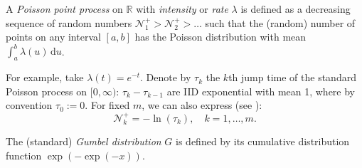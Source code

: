 \documentclass[12pt]{amsart}
\begin{document}
\begin{defn}  A {\it Poisson point process} on $\mathbb R$ with {\it intensity} or {\it rate} $\lambda$ is defined as a decreasing sequence of random numbers $\mathcal N^+_1 > \mathcal N^+_2 > \ldots$ such that the (random) number of points on any interval $[a, b]$ has the Poisson distribution with mean $\int_a^b\lambda(u)\,\mathrm{d}u$. 
\end{defn}

For example, take $\lambda(t) = e^{-t}$. Denote by $\tau_k$ the $k$th jump time of the standard Poisson process on $[0, \infty)$: $\tau_k - \tau_{k-1}$ are IID exponential with mean 1, where by convention $\tau_0 := 0$. For fixed $m$, we can also express 
(see  \cite[Chapter 8, Exercises 6 and 7]{Extreme-Book}):
\begin{equation}
\label{eq:rescaling+}
\mathcal N^+_k = -\ln(\tau_k),\quad k = 1, \ldots, m.
\end{equation}


\begin{defn} The (standard) {\it Gumbel distribution} $G$ is defined by its cumulative distribution function $\exp(-\exp(-x))$.
\end{defn}
\end{document}
